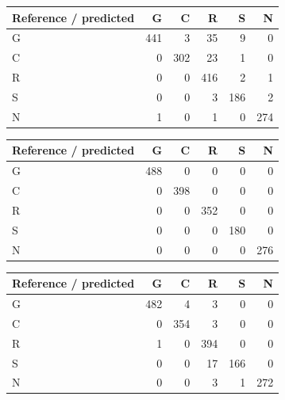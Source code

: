 \begingroup
\captionsetup{hypcap=false}
\begin{center}
\small
{}
\begin{tabular}{@{}lrrrrr@{}}
\toprule
Reference / predicted & G & C & R & S & N\\
\midrule
G & 441 & 3 & 35 & 9 & 0\\
C & 0 & 302 & 23 & 1 & 0\\
R & 0 & 0 & 416 & 2 & 1\\
S & 0 & 0 & 3 & 186 & 2\\
N & 1 & 0 & 1 & 0 & 274\\
\bottomrule
\end{tabular}
\end{center}

\begin{center}
\small
{}
\begin{tabular}{@{}lrrrrr@{}}
\toprule
Reference / predicted & G & C & R & S & N\\
\midrule
G & 488 & 0 & 0 & 0 & 0\\
C & 0 & 398 & 0 & 0 & 0\\
R & 0 & 0 & 352 & 0 & 0\\
S & 0 & 0 & 0 & 180 & 0\\
N & 0 & 0 & 0 & 0 & 276\\
\bottomrule
\end{tabular}
\end{center}

\begin{center}
\small
{}
\begin{tabular}{@{}lrrrrr@{}}
\toprule
Reference / predicted & G & C & R & S & N\\
\midrule
G & 482 & 4 & 3 & 0 & 0\\
C & 0 & 354 & 3 & 0 & 0\\
R & 1 & 0 & 394 & 0 & 0\\
S & 0 & 0 & 17 & 166 & 0\\
N & 0 & 0 & 3 & 1 & 272\\
\bottomrule
\end{tabular}
\end{center}

\endgroup

